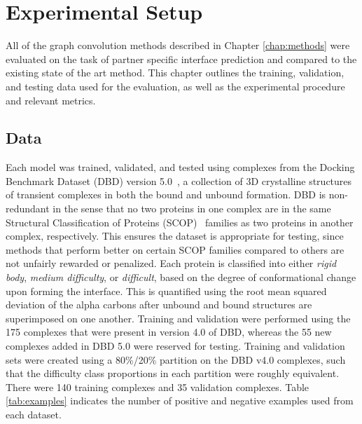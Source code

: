 \chapter{Experimental Setup}
\label{chap:experiments}

All of the graph convolution methods described in Chapter \ref{chap:methods} were evaluated on the task of partner specific interface prediction and compared to the existing state of the art method.
This chapter outlines the training, validation, and testing data used for the evaluation, as well as the experimental procedure and relevant metrics.

\section{Data}

Each model was trained, validated, and tested using complexes from the Docking Benchmark Dataset (DBD) version 5.0~\cite{vreven2015}, a collection of 3D crystalline structures of transient complexes in both the bound and unbound formation. 
DBD is non-redundant in the sense that no two proteins in one complex are in the same Structural Classification of Proteins (SCOP)~\cite{murzin1995} families as two proteins in another complex, respectively.
This ensures the dataset is appropriate for testing, since methods that perform better on certain SCOP families compared to others are not unfairly rewarded or penalized.
Each protein is classified into either \emph{rigid body}, \emph{medium difficulty}, or \emph{difficult}, based on the degree of conformational change upon forming the interface.
This is quantified using the root mean squared deviation of the alpha carbons after unbound and bound structures are superimposed on one another. 
Training and validation were performed using the 175 complexes that were present in version 4.0 of DBD, whereas the 55 new complexes added in DBD 5.0 were reserved for testing. 
Training and validation sets were created using a 80\%/20\% partition on the DBD v4.0 complexes, such that the difficulty class proportions in each partition were roughly equivalent.
There were 140 training complexes and 35 validation complexes.
Table \ref{tab:examples} indicates the number of positive and negative examples used from each dataset.

